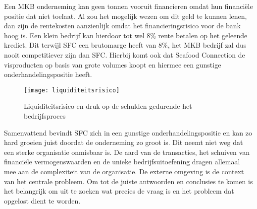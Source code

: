 Een MKB onderneming kan geen tonnen vooruit financieren omdat hun financiële positie dat niet toelaat. Al zou het mogelijk wezen om dit geld te kunnen lenen, dan zijn de rentekosten aanzienlijk omdat het financieringsrisico voor de bank hoog is. Een klein bedrijf kan hierdoor tot wel 8\% rente betalen op het geleende krediet. Dit terwijl SFC een brutomarge heeft van 8\%, het MKB bedrijf zal dus nooit competitiever zijn dan SFC. Hierbij komt ook dat Seafood Connection de visproducten op basis van grote volumes koopt en hiermee een gunstige onderhandelingspositie heeft. \citep{quickscan}

\begin{figure}[!h]
    \centering
    \texttt{[image: liquiditeitsrisico]}
    \caption{Liquiditeitsrisico en druk op de schulden gedurende het bedrijfsproces}
    \label{fig:liquiditeitsrisico}
\end{figure}

Samenvattend bevindt SFC zich in een gunstige onderhandelingspositie en kan zo hard groeien juist doordat de onderneming zo groot is. Dit neemt niet weg dat een sterke organisatie onmisbaar is. De aard van de transacties, het schuiven van financiële vermogenswaarden en de unieke bedrijfsuitoefening dragen allemaal mee aan de complexiteit van de organisatie. De externe omgeving is de context van het centrale probleem. Om tot de juiste antwoorden en conclusies te komen is het belangrijk om uit te zoeken wat precies de vraag is en het probleem dat opgelost dient te worden.
